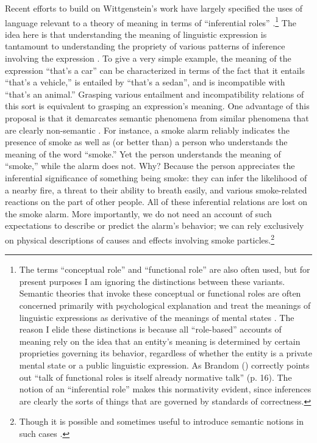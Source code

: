 Recent efforts to build on Wittgenstein's work have largely specified the uses of language relevant to a theory of meaning in terms of ``inferential roles'' \citep{Harman:1982,Brandom:2000,Brandom:1994,Block:1986}.\footnote{The terms ``conceptual role'' and ``functional role'' are also often used, but for present purposes I am ignoring the distinctions between these variants. Semantic theories that invoke these conceptual or functional roles are often concerned primarily with psychological explanation and treat the meanings of linguistic expressions as derivative of the meanings of mental states \citep[e.g.,][]{Harman:1982}. The reason I elide these distinctions is because all ``role-based'' accounts of meaning rely on the idea that an entity's meaning is determined by certain proprieties governing its behavior, regardless of whether the entity is a private mental state or a public linguistic expression. As Brandom (\citeyear{Brandom:1994}) correctly points out ``talk of functional roles is itself already normative talk'' (p. 16). The notion of an ``inferential role'' makes this normativity evident, since inferences are clearly the sorts of things that are governed by standards of correctness.} The idea here is that understanding the meaning of linguistic expression is tantamount to understanding the propriety of various patterns of inference involving the expression \citep{Brandom:1994}. To give a very simple example, the meaning of the expression ``that's a car'' can be characterized in terms of the fact that it entails ``that's a vehicle,'' is entailed by ``that's a sedan'', and is incompatible with ``that's an animal.'' Grasping various entailment and incompatibility relations of this sort is equivalent to grasping an expression's meaning. One advantage of this proposal is that it demarcates semantic phenomena from similar phenomena that are clearly non-semantic \citep{Brandom:2000,Brandom:1994,Brandom:2009}. For instance, a smoke alarm reliably indicates the presence of smoke as well as (or better than) a person who understands the meaning of the word ``smoke.'' Yet the person understands the meaning of ``smoke,'' while the alarm does not. Why? Because the person appreciates the inferential significance of something being smoke: they can infer the likelihood of a nearby fire, a threat to their ability to breath easily, and various smoke-related reactions on the part of other people. All of these inferential relations are lost on the smoke alarm. More importantly, we do not need an account of such expectations to describe or predict the alarm's behavior; we can rely exclusively on physical descriptions of causes and effects involving smoke particles.\footnote{Though it is possible and sometimes useful to introduce semantic notions in such cases \citep{Dennett:1987,Hochstein:2011}.}

